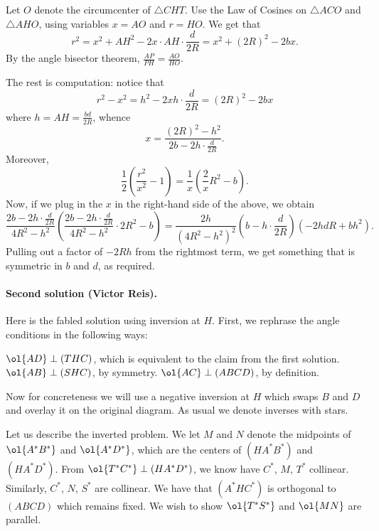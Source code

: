 \documentclass[11pt]{scrartcl}
\begin{document}
Let $O$ denote the circumcenter of $\triangle CHT$.
Use the Law of Cosines on $\triangle ACO$ and $\triangle AHO$,
using variables $x=AO$ and $r=HO$.
We get that
\[ r^2 = x^2 + AH^2 - 2x \cdot AH \cdot \frac{d}{2R} = x^2 + (2R)^2 - 2bx. \]
By the angle bisector theorem,
$\frac{AP}{PH} = \frac{AO}{HO}$.

The rest is computation: notice that
\[ r^2 - x^2 = h^2 - 2xh \cdot \frac{d}{2R} = (2R)^2 - 2bx \]
where $h = AH = \frac{bd}{2R}$, whence
\[ x = \frac{(2R)^2-h^2}{2b - 2h \cdot \frac{d}{2R}}. \]
Moreover,
\[ \frac{1}{2} \left( \frac{r^2}{x^2}-1 \right)
= \frac{1}{x} \left( \frac 2x R^2 - b \right). \]
Now, if we plug in the $x$ in the
right-hand side of the above, we obtain
\[ \frac{2b-2h \cdot \frac{d}{2R}}{4R^2-h^2}
  \left( \frac{2b-2h \cdot \frac{d}{2R}}{4R^2-h^2} \cdot 2R^2 - b\right)
  = \frac{2h}{(4R^2-h^2)^2} \left( b- h \cdot \frac{d}{2R} \right)
  \left( -2hdR + bh^2 \right). \]
Pulling out a factor of $-2Rh$ from the rightmost term,
we get something that is symmetric in $b$ and $d$, as required.

\paragraph{Second solution (Victor Reis).}
Here is the fabled solution using inversion at $H$.
First, we rephrase the angle conditions in the following ways:
\begin{itemize}
  \ii $\ol{AD} \perp (THC)$,
  which is equivalent to the claim from the first solution.
  \ii $\ol{AB} \perp (SHC)$, by symmetry.
  \ii $\ol{AC} \perp (ABCD)$, by definition.
\end{itemize}
Now for concreteness we will use a negative inversion at $H$
which swaps $B$ and $D$ and overlay it on the original diagram.
As usual we denote inverses with stars.

Let us describe the inverted problem.
We let $M$ and $N$ denote the midpoints of $\ol{A^\ast B^\ast}$
and $\ol{A^\ast D^\ast}$, which are the centers of
$(HA^\ast B^\ast)$ and $(HA^\ast D^\ast)$.
From $\ol{T^\ast C^\ast} \perp (HA^\ast D^\ast)$,
we know have $C^\ast$, $M$, $T^\ast$ collinear.
Similarly, $C^\ast$, $N$, $S^\ast$ are collinear.
We have that $(A^\ast H C^\ast)$ is orthogonal to $(ABCD)$ which remains fixed.
We wish to show $\ol{T^\ast S^\ast}$ and $\ol{MN}$ are parallel.
\end{document}
